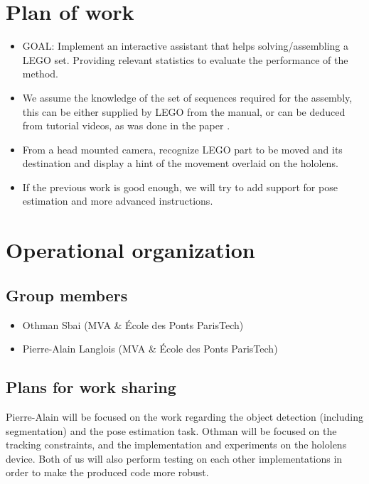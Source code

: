 \documentclass[a4paper,10pt]{article}
\begin{document}
\section{Plan of work}

\begin{itemize}
 \item GOAL: Implement an interactive assistant that helps solving/assembling a LEGO set. Providing relevant statistics to evaluate the performance of the method.
 \item We assume the knowledge of the set of sequences required for the assembly, this can be either 
 supplied by LEGO from the manual, or can be deduced from tutorial videos, as was done in the paper 
 \cite{alayrac_unsupervised_2015}.
 \item From a head mounted camera, recognize LEGO part to be moved and its destination and display a 
 hint of the movement overlaid on the hololens.
 \item If the previous work is good enough, we will try to add support for pose estimation and more 
 advanced instructions.

\end{itemize}


\section{Operational organization}

\subsection{Group members}

\begin{itemize}
 \item Othman Sbai (MVA \& École des Ponts ParisTech)
 \item Pierre-Alain Langlois (MVA \& École des Ponts ParisTech)
\end{itemize}


\subsection{Plans for work sharing}

Pierre-Alain will be focused on the work regarding the object detection (including segmentation) and the 
pose estimation task.
Othman will be focused on the tracking constraints, and the implementation and experiments on the hololens 
device. Both of us will also perform testing on each other implementations in order to make the produced 
code more robust.




\end{document}
